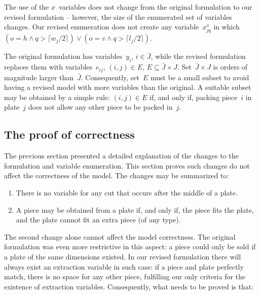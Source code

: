 \documentclass[smallextended]{svjour3}       %
\begin{document}
The use of the \(x\)~variables does not change from the original formulation to our revised formulation -- however, the size of the enumerated set of variables changes.
Our revised enumeration does not create any variable~\(x^o_{jq}\) in which \((o = h \land q > \lceil w_j / 2 \rceil) \lor (o = v \land q > \lceil l_j / 2 \rceil)\).

The original formulation has variables~\(y_i\), \(i \in \bar{J}\), while the revised formulation replaces them with variables~\(e_{ij}\), \((i, j) \in E\), \(E \subseteq \bar{J} \times J\).
Set~\(\bar{J} \times J\) is orders of magnitude larger than~\(\bar{J}\).
Consequently, set~\(E\) must be a small subset to avoid having a revised model with more variables than the original.
A suitable subset may be obtained by a simple rule: \((i, j) \in E\) if, and only if, packing piece~\(i\) in plate~\(j\) does not allow any other piece to be packed in~\(j\).


\subsection{The proof of correctness}

The previous section presented a detailed explanation of the changes to the formulation and variable enumeration.
This section proves such changes do not affect the correctness of the model.
The changes may be summarized to:

\begin{enumerate}
\item There is no variable for any cut that occurs after the middle of a plate.
\item A piece may be obtained from a plate if, and only if, the piece fits the plate, and the plate cannot fit an extra piece (of any type).
\end{enumerate}

The second change alone cannot affect the model correctness.
The original formulation was even more restrictive in this aspect:
a piece could only be sold if a plate of the same dimensions existed.
In our revised formulation there will always exist an extraction variable in such case:
if a piece and plate perfectly match, there is no space for any other piece, fulfilling our only criteria for the existence of extraction variables.
Consequently, what needs to be proved is that:
\end{document}
